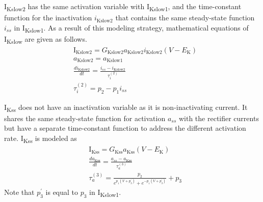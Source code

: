 \documentclass[11pt]{article}
\begin{document}
I\textsubscript{Kslow2} has the same activation variable with I\textsubscript{Kslow1}, and the time-constant function for the inactivation $i_{\mathrm{Kslow2}}$ that contains the same steady-state function $i_{ss}$ in I\textsubscript{Kslow1}. As a result of this modeling strategy, mathematical equations of I\textsubscript{Kslow} are given as follows. 
\begin{align}
    &\mathrm{I}_{\mathrm{Kslow2}} = G_{\mathrm{Kslow2}}a_{\mathrm{Kslow2}}i_{\mathrm{Kslow2}}(V-E_{\mathrm{K}}) \\
    &a_{\mathrm{Kslow2}} = a_{\mathrm{Kslow1}} \\
    &\frac{di_{\mathrm{Kslow2}}}{dt} = \frac{i_{ss}-i_{\mathrm{Kslow2}}}{\tau_{i}^{(2)}} \\
    &\tau_{i}^{(2)} = p_{2} - p_{1}i_{ss}
\end{align}

I\textsubscript{Kss} does not have an inactivation variable as it is non-inactivating current. It shares the same steady-state function for activation $a_{ss}$ with the rectifier currents but have a separate time-constant function to address the different activation rate. I\textsubscript{Kss} is modeled as
\begin{align}
    &\mathrm{I}_{\mathrm{Kss}} = G_{\mathrm{Kss}}a_{\mathrm{Kss}}(V-E_{\mathrm{K}}) \\
    &\frac{da_{\mathrm{Kss}}}{dt} = \frac{a_{ss}-a_{\mathrm{Kss}}}{\tau_{a}^{(3)}} \\
    &\tau_{a}^{(3)}= \frac{p_{2}}{e^{p_{1}(V+p_{3}^\prime)}+e^{-p_{1}(V+p_{3}^\prime)}} + p_{3}
\end{align}
Note that $p_{3}^\prime$ is equal to $p_{3}$ in I\textsubscript{Kslow1}. 
\end{document}
